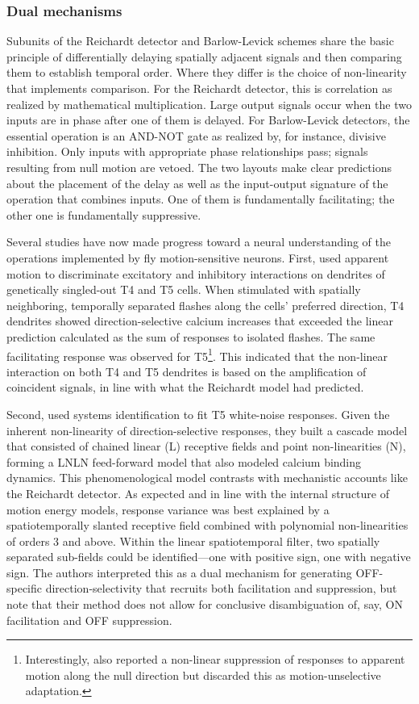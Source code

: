 \subsubsection{Dual mechanisms}
Subunits of the Reichardt detector and Barlow-Levick schemes share the basic principle of differentially delaying spatially adjacent signals and then comparing them to establish temporal order. Where they differ is the choice of non-linearity that implements comparison. For the Reichardt detector, this is correlation as realized by mathematical multiplication. Large output signals occur when the two inputs are in phase after one of them is delayed. For Barlow-Levick detectors, the essential operation is an AND-NOT gate as realized by, for instance, divisive inhibition. Only inputs with appropriate phase relationships pass; signals resulting from null motion are vetoed. The two layouts make clear predictions about the placement of the delay as well as the input-output signature of the operation that combines inputs. One of them is fundamentally facilitating; the other one is fundamentally suppressive.

Several studies have now made progress toward a neural understanding of the operations implemented by fly motion-sensitive neurons. First, \citet{Fisher:2015jo} used apparent motion to discriminate excitatory and inhibitory interactions on dendrites of genetically singled-out T4 and T5 cells. When stimulated with spatially neighboring, temporally separated flashes along the cells' preferred direction, T4 dendrites showed direction-selective calcium increases that exceeded the linear prediction calculated as the sum of responses to isolated flashes. The same facilitating response was observed for T5\footnote{Interestingly, \citet{Fisher:2015jo} also reported a non-linear suppression of responses to apparent motion along the null direction but discarded this as motion-unselective adaptation.}. This indicated that the non-linear interaction on both T4 and T5 dendrites is based on the amplification of coincident signals, in line with what the Reichardt model had predicted.

Second, \citet{Leong:2016hu} used systems identification to fit T5 white-noise responses. Given the inherent non-linearity of direction-selective responses, they built a cascade model that consisted of chained linear (L) receptive fields and point non-linearities (N), forming a LNLN feed-forward model that also modeled calcium binding dynamics. This phenomenological model contrasts with mechanistic accounts like the Reichardt detector. As expected and in line with the internal structure of motion energy models, response variance was best explained by a spatiotemporally slanted receptive field combined with polynomial non-linearities of orders 3 and above. Within the linear spatiotemporal filter, two spatially separated sub-fields could be identified---one with positive sign, one with negative sign. The authors interpreted this as a dual mechanism for generating OFF-specific direction-selectivity that recruits both facilitation and suppression, but note that their method does not allow for conclusive disambiguation of, say, ON facilitation and OFF suppression.

